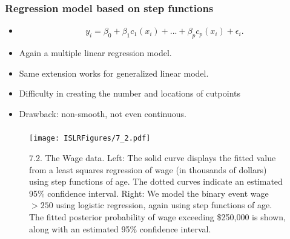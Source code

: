 \documentclass{beamer}
\begin{document}
  \begin{frame}
  	\frametitle{ Regression model based on step functions}
  	\begin{itemize}
  		\item 
  		$$ y_i = \beta_0 + \beta_1 c_1(x_i) + ... + \beta_p c_p(x_i) + \epsilon_i.$$
  		
  		\item Again a multiple linear regression model. 
  		\item Same extension works for generalized linear model.
  		\item Difficulty in creating the number and locations of cutpoints 
  		\item Drawback: non-smooth, not even continuous.
  		
  	\end{itemize}
  \end{frame} 
  
            
             \begin{frame}
             	\frametitle{ }
             	\begin{figure}
             		\centering
             		
             		\centering
             		\texttt{[image: ISLRFigures/7\_2.pdf]}
             		\caption{7.2. The Wage data. Left: The solid curve displays the fitted value from
             			a least squares regression of wage (in thousands of dollars) using step functions
             			of age. The dotted curves indicate an estimated 95\% confidence interval. Right:
             			We model the binary event wage$>250$ using logistic regression, again using step
             			functions of age. The fitted posterior probability of wage exceeding \$250,000 is
             			shown, along with an estimated 95\% confidence interval.
             		}
             	\end{figure}
             \end{frame}
             
\end{document}
